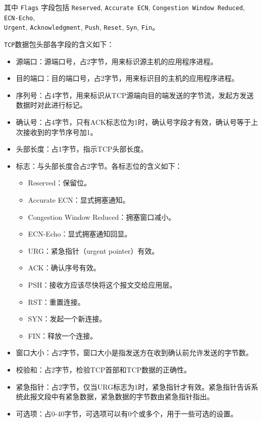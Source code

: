 \documentclass{article}
\begin{document}
其中 \texttt{Flags} 字段包括 \texttt{Reserved}, \texttt{Accurate ECN}, \texttt{Congestion Window Reduced}, \texttt{ECN-Echo}, \\ \texttt{Urgent}, \texttt{Acknowledgment}, \texttt{Push}, \texttt{Reset}, \texttt{Syn}, \texttt{Fin}。


\texttt{TCP}数据包头部各字段的含义如下：

\begin{itemize}[noitemsep]
  \item 源端口：源端口号，占2字节，用来标识源主机的应用程序进程。
  \item 目的端口：目的端口号，占2字节，用来标识目的主机的应用程序进程。
  \item 序列号：占4字节，用来标识从TCP源端向目的端发送的字节流，发起方发送数据时对此进行标记。
  \item 确认号：占4字节，只有ACK标志位为1时，确认号字段才有效，确认号等于上次接收到的字节序号加1。
  \item 头部长度：占1字节，指示TCP头部长度。
  \item 标志：与头部长度合占2字节。各标志位的含义如下：
        \begin{itemize}[noitemsep]
          \item Reserved：保留位。
          \item Accurate ECN：显式拥塞通知。
          \item Congestion Window Reduced：拥塞窗口减小。
          \item ECN-Echo：显式拥塞通知回显。
          \item URG：紧急指针（urgent pointer）有效。
          \item ACK：确认序号有效。
          \item PSH：接收方应该尽快将这个报文交给应用层。
          \item RST：重置连接。
          \item SYN：发起一个新连接。
          \item FIN：释放一个连接。
        \end{itemize}
  \item 窗口大小：占2字节，窗口大小是指发送方在收到确认前允许发送的字节数。
  \item 校验和：占2字节，检验TCP首部和TCP数据的正确性。
  \item 紧急指针：占2字节，仅当URG标志为1时，紧急指针才有效。紧急指针告诉系统此报文段中有紧急数据，紧急数据的字节数由紧急指针指出。
  \item 可选项：占0-40字节，可选项可以有0个或多个，用于一些可选的设置。
\end{itemize}
\end{document}
